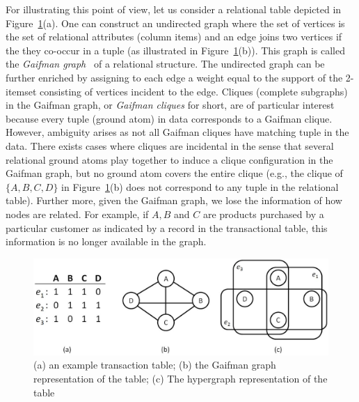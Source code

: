 For illustrating this point of view, let us consider a relational table depicted in Figure~\ref{fig:hg_and_rg}(a). One can construct an undirected graph where the set of vertices is the set of relational attributes (column items) and an edge joins two vertices if the they co-occur in a tuple (as illustrated in Figure~\ref{fig:hg_and_rg}(b)). This graph is called the \emph{Gaifman graph}~\cite{Hodkinson02finiteconformal} of a relational structure. The undirected graph can be further enriched by assigning to each edge a weight equal to the support of the 2-itemset consisting of vertices incident to the edge. Cliques (complete subgraphs) in the Gaifman graph, or \emph{Gaifman cliques} for short, are of particular interest because every tuple (ground atom) in data corresponds to a Gaifman clique. However, ambiguity arises as not all Gaifman cliques have matching tuple in the data. There exists cases where cliques are incidental in the sense that several relational ground atoms play together to induce a clique configuration in the Gaifman graph, but no ground atom covers the entire clique (e.g., the clique of $\{A,B,C,D\}$ in Figure~\ref{fig:hg_and_rg}(b) does not correspond to any tuple in the relational table). Further more, given the Gaifman graph, we lose the information of how nodes are related. For example, if $A, B$ and $C$ are products purchased by a particular customer as indicated by a record in the transactional table, this information is no longer available in the graph.

\begin{figure}[tbh]
\begin{center}
\includegraphics[width=.8\textwidth]{fig/hg_and_rg1.eps}
\end{center}
\caption[An example of simple graph vs. hypergraph for representing a relational table.]{\label{fig:hg_and_rg} (a) an example transaction table; (b) the Gaifman graph representation of the table; (c) The hypergraph representation of the table}
\end{figure}

